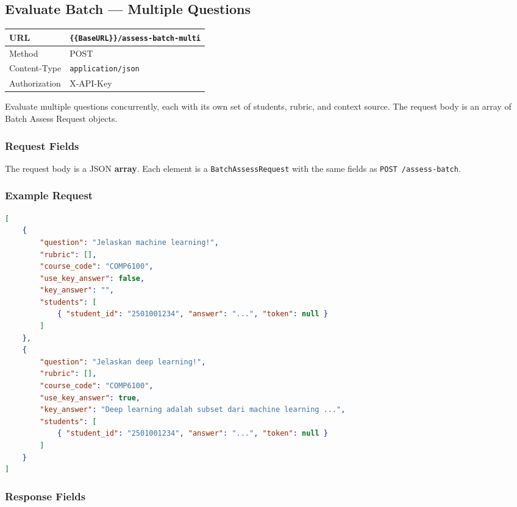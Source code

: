 \documentclass[11pt]{article}
\begin{document}
\subsection{Evaluate Batch — Multiple Questions}

\begin{tabular}{|H{3cm}|p{12.1cm}|}
  \hline
  URL           & \texttt{\{\{BaseURL\}\}/assess-batch-multi} \\
  \hline
  Method        & POST \\
  \hline
  Content-Type  & \texttt{application/json} \\
  \hline
  Authorization & X-API-Key \\
  \hline
\end{tabular}

Evaluate multiple questions concurrently, each with its own set of students,
rubric, and context source. The request body is an array of Batch Assess
Request objects.

\subsubsection{Request Fields}

The request body is a JSON \textbf{array}. Each element is a
\texttt{BatchAssessRequest} with the same fields as
\texttt{POST /assess-batch}.

\subsubsection{Example Request}

\begin{lstlisting}[language=json]
[
    {
        "question": "Jelaskan machine learning!",
        "rubric": [],
        "course_code": "COMP6100",
        "use_key_answer": false,
        "key_answer": "",
        "students": [
            { "student_id": "2501001234", "answer": "...", "token": null }
        ]
    },
    {
        "question": "Jelaskan deep learning!",
        "rubric": [],
        "course_code": "COMP6100",
        "use_key_answer": true,
        "key_answer": "Deep learning adalah subset dari machine learning ...",
        "students": [
            { "student_id": "2501001234", "answer": "...", "token": null }
        ]
    }
]
\end{lstlisting}

\subsubsection{Response Fields}
\end{document}
